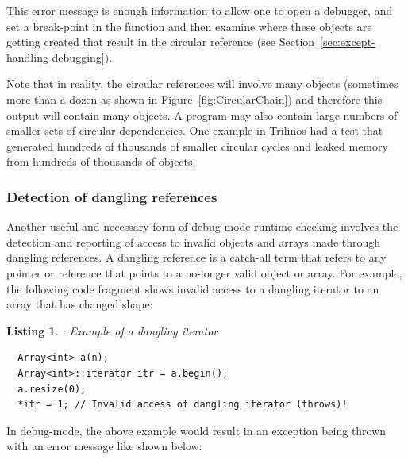 \documentclass[pdf,ps2pdf,11pt]{SANDreport}
\newtheorem{listing}{Listing}
\begin{document}
This error message is enough information to allow one to open a
debugger, and set a break-point in the function
{} and then examine where these
objects are getting created that result in the circular reference (see
Section~\ref{sec:except-handling-debugging}).

Note that in reality, the circular references will involve many
objects (sometimes more than a dozen as shown in
Figure~\ref{fig:CircularChain}) and therefore this output will contain
many {} objects.  A program may also contain large
numbers of smaller sets of circular dependencies.  One example in
Trilinos had a test that generated hundreds of thousands of smaller
circular cycles and leaked memory from hundreds of thousands of
objects.


%
{}\subsubsection{Detection of dangling references}
\label{sec:detection-dangling-references}
%

Another useful and necessary form of debug-mode runtime checking
involves the detection and reporting of access to invalid objects and
arrays made through dangling references.  A dangling reference is a
catch-all term that refers to any pointer or reference that points to
a no-longer valid object or array.  For example, the following code
fragment shows invalid access to a dangling iterator to an array that
has changed shape:

\begin{listing}: Example of a dangling iterator \\
\label{listing:Array-dangling-iterator}
{\small\begin{verbatim}
  Array<int> a(n);
  Array<int>::iterator itr = a.begin();
  a.resize(0);
  *itr = 1; // Invalid access of dangling iterator (throws)!
\end{verbatim}}
\end{listing}

In debug-mode, the above example would result in an exception being
thrown with an error message like shown below:
\end{document}
